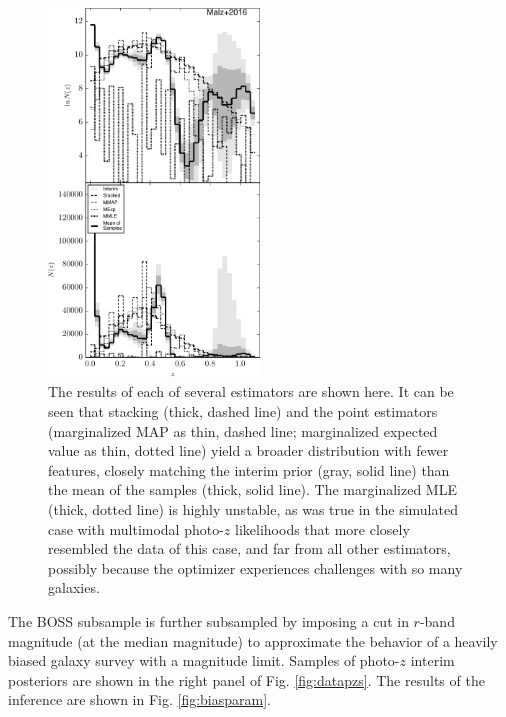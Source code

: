 \documentclass[preprint]{aastex}
\begin{document}
\begin{figure}
\includegraphics[width=0.5\textwidth]{figs/boss/comps.pdf}
\caption{The results of each of several estimators are shown here.  It can be 
seen that stacking (thick, dashed line) and the point estimators (marginalized 
MAP as thin, dashed line; marginalized expected value as thin, dotted line) 
yield a broader distribution with fewer features, closely matching the interim 
prior (gray, solid line) than the mean of the samples (thick, solid line).  The 
marginalized MLE (thick, dotted line) is highly unstable, as was true in the 
simulated case with multimodal photo-$z$ likelihoods that more closely 
resembled the data of this case, and far from all other estimators, possibly 
because the optimizer experiences challenges with so many galaxies.}
\label{fig:datacomp}
\end{figure}

The BOSS subsample is further subsampled by imposing a cut in $r$-band 
magnitude (at the median magnitude) to approximate the behavior of a heavily 
biased galaxy survey with a magnitude limit.  Samples of photo-$z$ interim 
posteriors are shown in the right panel of Fig. \ref{fig:datapzs}.  The results 
of the inference are shown in Fig. \ref{fig:biasparam}.
\end{document}
